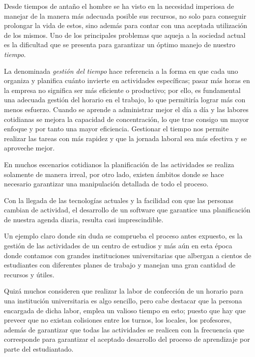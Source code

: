 \begin{introduction}
	Desde tiempos de antaño el hombre se ha visto en la necesidad imperiosa de manejar de la manera más adecuada posible sus recursos, no solo para conseguir prolongar la vida de estos, sino además para contar con una aceptada utilización de los mismos. Uno de los principales problemas que aqueja a la sociedad actual es la dificultad que se presenta para garantizar un óptimo manejo de nuestro \textit{tiempo}.
	
	La denominada \textit{gestión del tiempo} hace referencia a la forma en que cada uno organiza y planifica cuánto invierte en actividades específicas; pasar más horas en la empresa no significa ser más eficiente o productivo; por ello, es fundamental una adecuada gestión del horario en el trabajo, lo que permitiría lograr más con menos esfuerzo. Cuando se aprende a administrar mejor el día a día y las labores cotidianas se mejora la capacidad de concentración, lo que trae consigo un mayor enfoque y por tanto una mayor eficiencia. Gestionar el tiempo nos permite realizar las tareas con más rapidez y que la jornada laboral sea más efectiva y se aproveche mejor.
	
	En muchos escenarios cotidianos la planificación de las actividades se realiza solamente de manera irreal, por otro lado, existen ámbitos donde se hace necesario garantizar una manipulación detallada de todo el proceso.
	
	Con la llegada de las tecnologías actuales y la facilidad con que las personas cambian de actividad, el desarrollo de un software que garantice una planificación de nuestra agenda diaria, resulta casi imprescindible.
	
	Un ejemplo claro donde sin duda se comprueba el proceso antes expuesto, es la gestión de las actividades de un centro de estudios y más aún en esta época donde contamos con grandes instituciones universitarias que albergan a cientos de estudiantes con diferentes planes de trabajo y manejan una gran cantidad de recursos y útiles.
	
	Quizá muchos consideren que realizar la labor de confección de un horario para una institución universitaria es algo sencillo, pero cabe destacar que la persona encargada de dicha labor, emplea un valioso tiempo en esto; puesto que hay que preveer que no existan colisiones entre los turnos, los locales, los profesores, además de garantizar que todas las actividades se realicen con la frecuencia que corresponde para garantizar el aceptado desarrollo del proceso de aprendizaje por parte del estudiantado.
	

\end{introduction}
